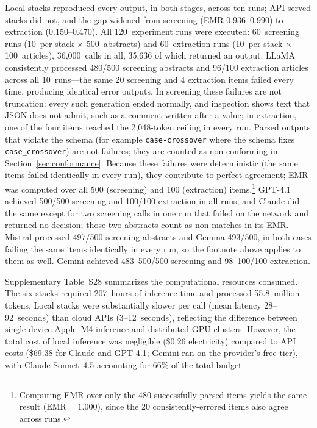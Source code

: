 \documentclass[preprint,review,12pt,authoryear]{elsarticle}
\newcommand{\emr}{\textrm{EMR}}
\begin{document}
Local stacks reproduced every output, in both stages, across ten runs; API-served stacks did not, and the gap widened from screening (EMR 0.936--0.990) to extraction (0.150--0.470).
All 120~experiment runs were executed: 60~screening runs (10~per stack $\times$ 500~abstracts) and 60~extraction runs (10~per stack $\times$ 100~articles), 36{,}000~calls in all, 35{,}636 of which returned an output.
LLaMA consistently processed 480/500 screening abstracts and 96/100 extraction articles across all 10~runs---the same 20 screening and 4 extraction items failed every time, producing identical error outputs.
In screening these failures are not truncation: every such generation ended normally, and inspection shows text that JSON does not admit, such as a comment written after a value; in extraction, one of the four items reached the 2{,}048-token ceiling in every run. Parsed outputs that violate the schema (for example \texttt{case-crossover} where the schema fixes \texttt{case\_crossover}) are not failures; they are counted as non-conforming in Section~\ref{sec:conformance}.
Because these failures were deterministic (the same items failed identically in every run), they contribute to perfect agreement; EMR was computed over all 500 (screening) and 100 (extraction) items.\footnote{Computing EMR over only the 480 successfully parsed items yields the same result ($\emr{=}1.000$), since the 20 consistently-errored items also agree across runs.}
GPT-4.1 achieved 500/500 screening and 100/100 extraction in all runs, and Claude did the same except for two screening calls in one run that failed on the network and returned no decision; those two abstracts count as non-matches in its EMR.
Mistral processed 497/500 screening abstracts and Gemma 493/500, in both cases failing the same items identically in every run, so the footnote above applies to them as well.
Gemini achieved 483--500/500 screening and 98--100/100 extraction.

Supplementary Table~S28 summarizes the computational resources consumed.
The six stacks required 207~hours of inference time and processed 55.8~million tokens.
Local stacks were substantially slower per call (mean latency 28--92~seconds) than cloud APIs (3--12~seconds), reflecting the difference between single-device Apple~M4 inference and distributed GPU clusters.
However, the total cost of local inference was negligible (\$0.26 electricity) compared to API costs (\$69.38 for Claude and GPT-4.1; Gemini ran on the provider's free tier), with Claude Sonnet~4.5 accounting for 66\% of the total budget.
\end{document}
